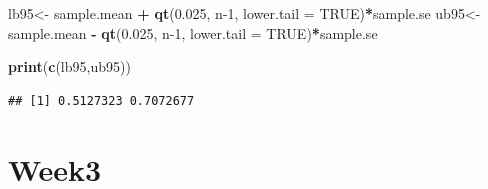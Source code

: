 \documentclass[
]{book}
\newenvironment{Shaded}{\begin{snugshade}}{\end{snugshade}}
\newcommand{\DataTypeTok}[1]{\textcolor[rgb]{0.13,0.29,0.53}{#1}}
\newcommand{\DecValTok}[1]{\textcolor[rgb]{0.00,0.00,0.81}{#1}}
\newcommand{\FloatTok}[1]{\textcolor[rgb]{0.00,0.00,0.81}{#1}}
\newcommand{\KeywordTok}[1]{\textcolor[rgb]{0.13,0.29,0.53}{\textbf{#1}}}
\newcommand{\NormalTok}[1]{#1}
\newcommand{\OperatorTok}[1]{\textcolor[rgb]{0.81,0.36,0.00}{\textbf{#1}}}
\newcommand{\OtherTok}[1]{\textcolor[rgb]{0.56,0.35,0.01}{#1}}
\newcommand{\StringTok}[1]{\textcolor[rgb]{0.31,0.60,0.02}{#1}}
\begin{document}
\begin{Shaded}
\begin{Highlighting}[]
\NormalTok{lb95<-}\StringTok{ }\NormalTok{sample.mean }\OperatorTok{+}\StringTok{ }\KeywordTok{qt}\NormalTok{(}\FloatTok{0.025}\NormalTok{, n}\DecValTok{-1}\NormalTok{, }\DataTypeTok{lower.tail =} \OtherTok{TRUE}\NormalTok{)}\OperatorTok{*}\NormalTok{sample.se}
\NormalTok{ub95<-}\StringTok{ }\NormalTok{sample.mean }\OperatorTok{-}\StringTok{ }\KeywordTok{qt}\NormalTok{(}\FloatTok{0.025}\NormalTok{, n}\DecValTok{-1}\NormalTok{, }\DataTypeTok{lower.tail =} \OtherTok{TRUE}\NormalTok{)}\OperatorTok{*}\NormalTok{sample.se}

\KeywordTok{print}\NormalTok{(}\KeywordTok{c}\NormalTok{(lb95,ub95))}
\end{Highlighting}
\end{Shaded}

\begin{verbatim}
## [1] 0.5127323 0.7072677
\end{verbatim}

\hypertarget{week3}{%
\section{Week3}\label{week3}}
\end{document}
